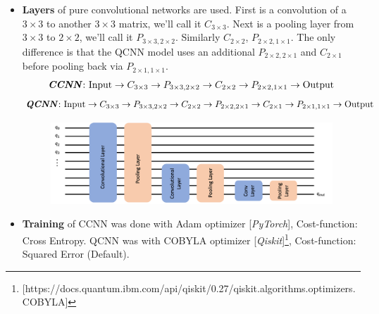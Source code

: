 \documentclass[a4paper]{article}
\begin{document}
\begin{itemize}
\item \textbf{Layers} of pure convolutional networks are used. First is a convolution of a $3\times3$ to another $3\times3$ matrix, we'll call it $C_{3\times3}$. Next is a pooling layer from $3\times3$ to $2\times2$, we'll call it $P_{3\times3,2\times2}$. Similarly $C_{2\times2}$, $P_{2\times2,1\times1}$. The only difference is that the QCNN model uses an additional $P_{2\times2,2\times1}$ and $C_{2\times1}$ before pooling back via $P_{2\times1,1\times1}$.
\[\text{\emph{\textbf{CCNN}}: Input} \rightarrow C_{3\times3} \rightarrow P_{3\times3,2\times2} \rightarrow C_{2\times2} \rightarrow P_{2\times2,1\times1} \rightarrow \text{Output}\]
\[\text{\emph{\textbf{QCNN}}: Input} \rightarrow C_{3\times3} \rightarrow P_{3\times3,2\times2} \rightarrow C_{2\times2} \rightarrow P_{2\times2,2\times1} \rightarrow C_{2\times1} \rightarrow P_{2\times1,1\times1} \rightarrow \text{Output}\]

\begin{figure}[h]
\centering
\includegraphics[height = 0.3\textwidth]{assets/QCNN.png}
\label{fig:test}
\end{figure}

\item \textbf{Training} of CCNN was done with Adam optimizer [\emph{PyTorch}], Cost-function: Cross Entropy. QCNN was with COBYLA optimizer [\emph{Qiskit}]\footnote{[https://docs.quantum.ibm.com/api/qiskit/0.27/qiskit.algorithms.optimizers.COBYLA]}, Cost-function: Squared Error (Default).


\end{itemize}
\end{document}

